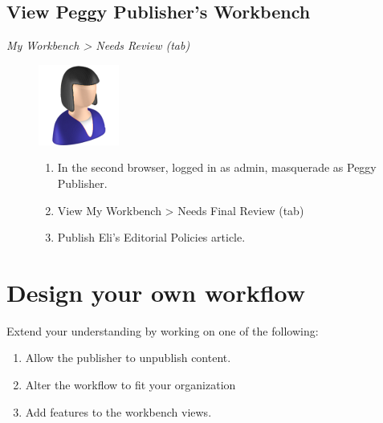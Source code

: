 \documentclass[letterpaper,10pt,english]{sphinxmanual}
\begin{document}
\section{View Peggy Publisher's Workbench}
\label{moderation:view-peggy-publisher-s-workbench}
\emph{My Workbench \textgreater{} Needs Review (tab)}
\begin{figure}[htbp]
\centering

\includegraphics{sites/default/files/recipes/user_icons/publisher.png}
{\small \begin{enumerate}
\item {} 
In the second browser, logged in as admin, masquerade as Peggy Publisher.

\item {} 
View My Workbench \textgreater{} Needs Final Review (tab)

\item {} 
Publish Eli's Editorial Policies article.

\end{enumerate}
}\end{figure}


\chapter{Design your own workflow}
\label{moderation:design-your-own-workflow}
Extend your understanding by working on one of the following:
\begin{enumerate}
\item {} 
Allow the publisher to unpublish content.

\item {} 
Alter the workflow to fit your organization

\item {} 
Add features to the workbench views.

\end{enumerate}



\renewcommand{\indexname}{Index}
\printindex
\end{document}
